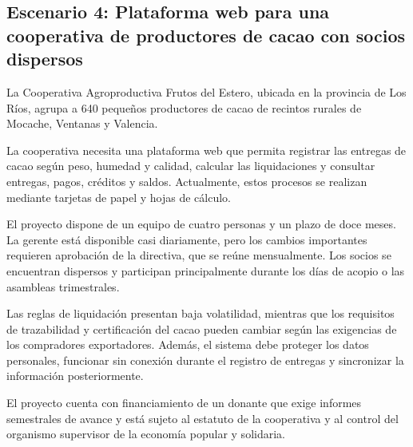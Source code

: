 

\subsection{Escenario 4: Plataforma web para una cooperativa de productores de cacao con socios dispersos}

La Cooperativa Agroproductiva Frutos del Estero, ubicada en la provincia de Los Ríos, agrupa a 640 pequeños productores de cacao de recintos rurales de Mocache, Ventanas y Valencia.

La cooperativa necesita una plataforma web que permita registrar las entregas de cacao según peso, humedad y calidad, calcular las liquidaciones y consultar entregas, pagos, créditos y saldos. Actualmente, estos procesos se realizan mediante tarjetas de papel y hojas de cálculo.

El proyecto dispone de un equipo de cuatro personas y un plazo de doce meses. La gerente está disponible casi diariamente, pero los cambios importantes requieren aprobación de la directiva, que se reúne mensualmente. Los socios se encuentran dispersos y participan principalmente durante los días de acopio o las asambleas trimestrales.

Las reglas de liquidación presentan baja volatilidad, mientras que los requisitos de trazabilidad y certificación del cacao pueden cambiar según las exigencias de los compradores exportadores. Además, el sistema debe proteger los datos personales, funcionar sin conexión durante el registro de entregas y sincronizar la información posteriormente.

El proyecto cuenta con financiamiento de un donante que exige informes semestrales de avance y está sujeto al estatuto de la cooperativa y al control del organismo supervisor de la economía popular y solidaria.

\small
\setlength{\tabcolsep}{4pt}
\renewcommand{\arraystretch}{1.35}

